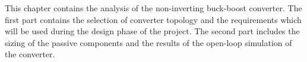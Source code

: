 
This chapter contains the analysis of the non-inverting buck-boost converter. The first part contains the selection of converter topology and the requirements which will be used during the design phase of the project. The second part includes the sizing of the passive components and the results of the open-loop simulation of the converter.
